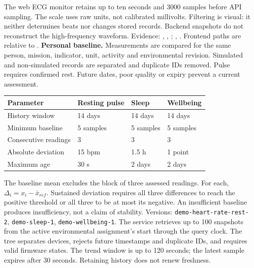 The web ECG monitor retains up to ten seconds and 3000 samples before API sampling. The scale uses raw units, not calibrated millivolts. Filtering is visual: it neither determines beats nor changes stored records. Backend snapshots do not reconstruct the high-frequency waveform.
\vfill
{\footnotesize\color{muted}Evidence: , , ; , . Frontend paths are relative to .}
\newpage
{}
\textbf{Personal baseline.} Measurements are compared for the same person, mission, indicator, unit, activity and environmental revision. Simulated and non-simulated records are separated and duplicate IDs removed. Pulse requires confirmed rest. Future dates, poor quality or expiry prevent a current assessment.
\par\noindent\begin{tabularx}{\linewidth}{@{}lXXX@{}}
\toprule Parameter & Resting pulse & Sleep & Wellbeing\\\midrule
History window & 14 days & 14 days & 14 days\\
Minimum baseline & 5 samples & 5 samples & 5 samples\\
Consecutive readings & 3 & 3 & 3\\
Absolute deviation & 15 bpm & 1.5 h & 1 point\\
Maximum age & 30 s & 2 days & 2 days\\\bottomrule
\end{tabularx}\par
The baseline mean excludes the block of three assessed readings. For each, $\Delta_i=x_i-\bar{x}_{ref}$. Sustained deviation requires all three differences to reach the positive threshold or all three to be at most its negative. An insufficient baseline produces insufficiency, not a claim of stability. Versions: \texttt{demo-heart-rate-rest-2}, \texttt{demo-sleep-1}, \texttt{demo-wellbeing-1}.
The service retrieves up to 100 snapshots from the active environmental assignment's start through the query clock. The tree separates devices, rejects future timestamps and duplicate IDs, and requires valid firmware states. The trend window is up to 120 seconds; the latest sample expires after 30 seconds. Retaining history does not renew freshness.
